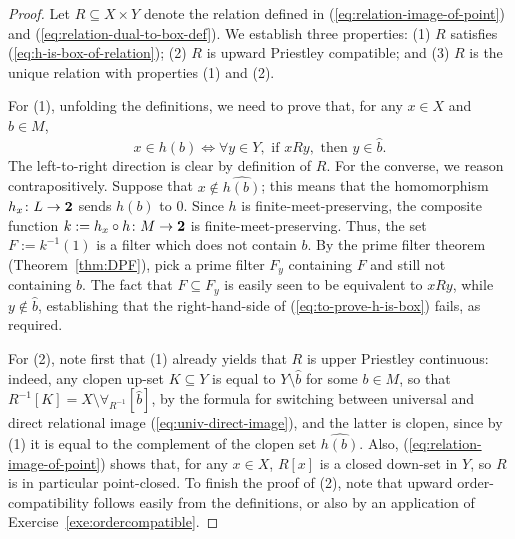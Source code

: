 \begin{proof}
	Let $R \subseteq X \times Y$ denote the relation defined in (\ref{eq:relation-image-of-point}) and (\ref{eq:relation-dual-to-box-def}). We establish three properties: (1) $R$ satisfies (\ref{eq:h-is-box-of-relation}); (2) $R$ is upward Priestley compatible; and (3) $R$ is the unique relation with properties (1) and (2).

	For (1), unfolding the definitions, we need to prove that, for any $x \in X$ and $b \in M$, 
	\begin{equation} \label{eq:to-prove-h-is-box} 
		x \in \widehat{h(b)} \iff \forall y \in Y, \text{ if } x R y, \text{ then } y \in \widehat{b}.
	\end{equation}
	The left-to-right direction is clear by definition of $R$. For the converse, we reason contrapositively. Suppose that $x \not\in \widehat{h(b)}$; this means that the homomorphism $h_x \colon L \to {\bf 2}$ sends $h(b)$ to $0$. Since $h$ is finite-meet-preserving, the composite function $k := h_x \circ h \colon M \to {\bf 2}$ is finite-meet-preserving. Thus, the set $F := k^{-1}(1)$ is a filter which does not contain $b$. By the prime filter theorem (Theorem~\ref{thm:DPF}), pick a prime filter $F_y$ containing $F$ and still not containing $b$. The fact that $F \subseteq F_y$ is easily seen to be equivalent to $x{R}y$, while $y \not\in \widehat{b}$, establishing that the right-hand-side of (\ref{eq:to-prove-h-is-box}) fails, as required. 
	
	For (2), note first that (1) already yields that $R$ is upper Priestley  continuous: indeed, any clopen up-set $K \subseteq Y$ is equal to $Y \setminus \widehat{b}$ for some $b \in M$, so that $R^{-1}[K] = X \setminus \forall_{R^{-1}}[\widehat{b}]$, by the formula for switching between universal and direct relational image (\ref{eq:univ-direct-image}), and the latter is clopen, since by (1) it is equal to the complement of the clopen set $\widehat{h(b)}$. Also, (\ref{eq:relation-image-of-point}) shows that, for any $x \in X$, $R[x]$ is a closed down-set in $Y$, so $R$ is in particular point-closed. To finish the proof of (2), note that 
	upward order-compatibility follows easily from the definitions, or also by an application of Exercise~\ref{exe:ordercompatible}.


\end{proof}
